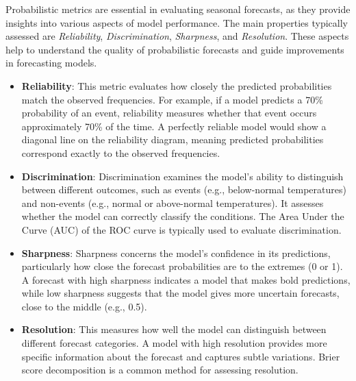 Probabilistic metrics are essential in evaluating seasonal forecasts, as they provide insights into various aspects of model performance. The main properties typically assessed are \textit{Reliability}, \textit{Discrimination}, \textit{Sharpness}, and \textit{Resolution}. These aspects help to understand the quality of probabilistic forecasts and guide improvements in forecasting models.

\begin{itemize}
    \item \textbf{Reliability}: This metric evaluates how closely the predicted probabilities match the observed frequencies. For example, if a model predicts a 70\% probability of an event, reliability measures whether that event occurs approximately 70\% of the time. A perfectly reliable model would show a diagonal line on the reliability diagram, meaning predicted probabilities correspond exactly to the observed frequencies.
    
    \item \textbf{Discrimination}: Discrimination examines the model's ability to distinguish between different outcomes, such as events (e.g., below-normal temperatures) and non-events (e.g., normal or above-normal temperatures). It assesses whether the model can correctly classify the conditions. The Area Under the Curve (AUC) of the ROC curve is typically used to evaluate discrimination.
    
    \item \textbf{Sharpness}: Sharpness concerns the model’s confidence in its predictions, particularly how close the forecast probabilities are to the extremes (0 or 1). A forecast with high sharpness indicates a model that makes bold predictions, while low sharpness suggests that the model gives more uncertain forecasts, close to the middle (e.g., 0.5).
    
    \item \textbf{Resolution}: This measures how well the model can distinguish between different forecast categories. A model with high resolution provides more specific information about the forecast and captures subtle variations. Brier score decomposition is a common method for assessing resolution.
\end{itemize}



%
%



